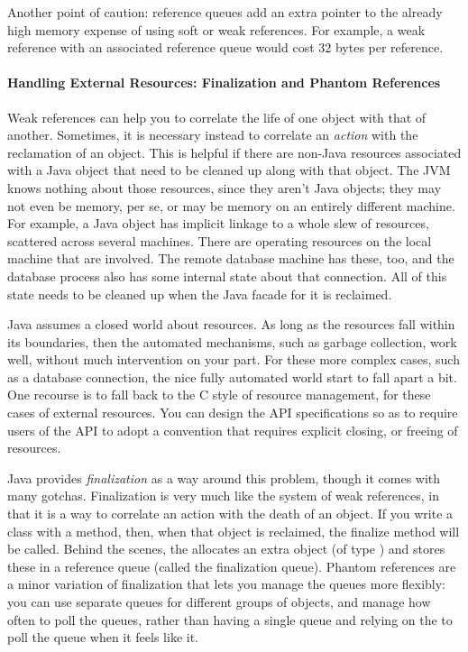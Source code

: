 Another point of caution: reference queues add an extra pointer to the already
high memory expense of using soft or weak references. For example, a weak
reference with an associated reference queue would cost 32 bytes per reference.

\paragraph{Handling External Resources: Finalization and Phantom References}

Weak references can help you to correlate the life of one object with that of
another. Sometimes, it is necessary instead to correlate an \emph{action} with
the reclamation of an object. This is helpful if there are non-Java resources
associated with a Java object that need to be cleaned up along with that object.
The JVM knows nothing about those resources, since they aren't Java objects;
they may not even be memory, per se, or may be memory on an entirely different
machine. For example, a Java  object has implicit
linkage to a whole slew of resources, scattered across several machines. There
are operating resources on the local machine that are involved. The remote
database machine has these, too, and the database process also has some
internal state about that connection. All of this state needs to be cleaned up
when the Java facade for it is reclaimed.

Java assumes a closed world about resources. As long as the resources fall
within its boundaries, then the automated mechanisms, such as garbage
collection, work well, without much intervention on your part. For these
more complex cases, such as a database connection, the nice fully automated
world start to fall apart a bit.
One recourse is to fall back to the C style of resource management, for these
cases of external resources. You can design the API specifications so as to
require users of the API to adopt a convention that requires explicit closing,
or freeing of resources. 

Java provides \emph{finalization} as a way around this problem, though it comes
with many gotchas. Finalization is very much like the system of weak references,
in that it is a way to correlate an action with the death of an object. If you
write a class with a  method, then, when that object is
reclaimed, the finalize method will be called. Behind the scenes, the \jre
allocates an extra object (of type ) and
stores these in a reference queue (called the finalization queue). Phantom
references are a minor variation of finalization that lets you manage the queues
more flexibly: you can use separate queues for different groups of objects, and
manage how often to poll the queues, rather than having a single queue and
relying on the \jre to poll the queue when it feels like it.

